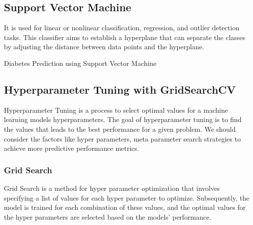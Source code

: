 \subsection{Support Vector Machine}
It is used for linear or nonlinear classification, regression, and outlier detection tasks. This classifier aims to establish a hyperplane that can separate the classes by adjusting the distance between data points and the hyperplane.
\begin{algorithm}
    \caption{Diabetes Prediction using Support Vector Machine}
    \label{algo:algo_svm}
    \begin{algorithmic}[1]
        \Statex
    \end{algorithmic}
\end{algorithm}

\subsection{Hyperparameter Tuning with GridSearchCV}
Hyperparameter Tuning is a process to select optimal values for a machine learning models hyperparameters. The goal of hyperparameter tuning is to find the values that leads to the best performance for a given problem. We should consider the factors like hyper parameters, meta parameter search strategies to achieve more predictive performance metrics.

\subsubsection{Grid Search}
Grid Search is a method for hyper parameter optimization that involves specifying a list of values for each hyper parameter to optimize. Subsequently, the model is trained for each combination of these values, and the optimal values for the hyper parameters are selected based on the models' performance.

